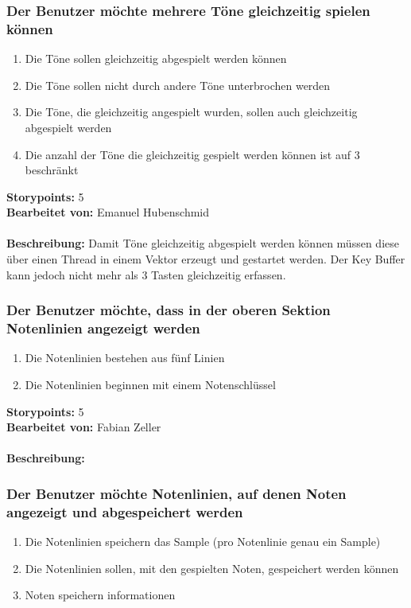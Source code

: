 \subsubsection{Der Benutzer möchte mehrere Töne gleichzeitig spielen können}

\begin{enumerate}
 \item Die Töne sollen gleichzeitig abgespielt werden können
 \item Die Töne sollen nicht durch andere Töne unterbrochen werden
 \item Die Töne, die gleichzeitig angespielt wurden, sollen auch gleichzeitig abgespielt werden
 \item Die  anzahl der Töne die gleichzeitig gespielt werden können ist auf 3 beschränkt
\end{enumerate}

\textbf{Storypoints:} 5 \\
\textbf{Bearbeitet von:} Emanuel Hubenschmid \\
\\
\textbf{Beschreibung:} Damit Töne gleichzeitig abgespielt werden können müssen diese über 
einen Thread in einem Vektor erzeugt und gestartet werden. Der Key Buffer kann jedoch nicht 
mehr als 3 Tasten gleichzeitig erfassen.


\subsubsection{Der Benutzer möchte, dass in der oberen Sektion Notenlinien angezeigt werden}

\begin{enumerate}
 \item Die Notenlinien bestehen aus fünf Linien
 \item Die Notenlinien beginnen mit einem Notenschlüssel
\end{enumerate}

\textbf{Storypoints:} 5 \\
\textbf{Bearbeitet von:} Fabian Zeller \\
\\
\textbf{Beschreibung:} 


\subsubsection{Der Benutzer möchte Notenlinien, auf denen Noten angezeigt und abgespeichert werden}

\begin{enumerate}
 \item Die Notenlinien speichern das Sample (pro Notenlinie genau ein Sample)
 \item Die Notenlinien sollen, mit den gespielten Noten, gespeichert werden können
 \item Noten speichern informationen
\end{enumerate}

